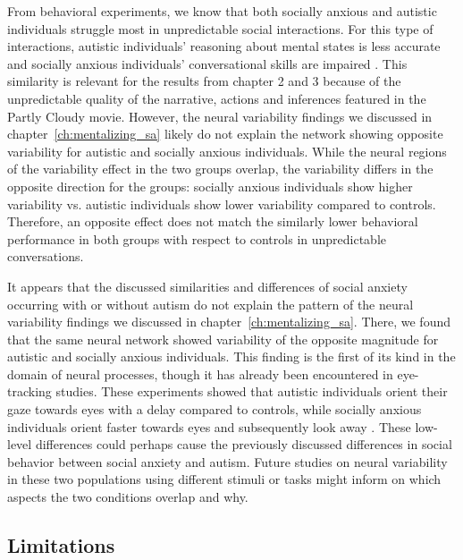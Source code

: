 From behavioral experiments, we know that both socially anxious and autistic individuals struggle most in unpredictable social interactions. For this type of interactions, autistic individuals' reasoning about mental states is less accurate and socially anxious individuals' conversational skills are impaired \citep{roeyers2001,ponnet2008,pilkonis1977,thompson2002}. This similarity is relevant for the results from chapter 2 and 3 because of the unpredictable quality of the narrative, actions and inferences featured in the Partly Cloudy movie. However, the neural variability findings we discussed in chapter~\ref{ch:mentalizing_sa} likely do not explain the network showing opposite variability for autistic and socially anxious individuals. While the neural regions of the variability effect in the two groups overlap, the variability differs in the opposite direction for the groups: socially anxious individuals show higher variability vs. autistic individuals show lower variability compared to controls. Therefore, an opposite effect does not match the similarly lower behavioral performance in both groups with respect to controls in unpredictable conversations.

It appears that the discussed similarities and differences of social anxiety occurring with or without autism do not explain the pattern of the neural variability findings we discussed in chapter~\ref{ch:mentalizing_sa}. There, we found that the same neural network showed variability of the opposite magnitude for autistic and socially anxious individuals. This finding is the first of its kind in the domain of neural processes, though it has already been encountered in eye-tracking studies. These experiments showed that autistic individuals orient their gaze towards eyes with a delay compared to controls, while socially anxious individuals orient faster towards eyes and subsequently look away \citep{ni2023,kleberg2017}. These low-level differences could perhaps cause the previously discussed differences in social behavior between social anxiety and autism. Future studies on neural variability in these two populations using different stimuli or tasks might inform on which aspects the two conditions overlap and why.

\subsection*{Limitations}

